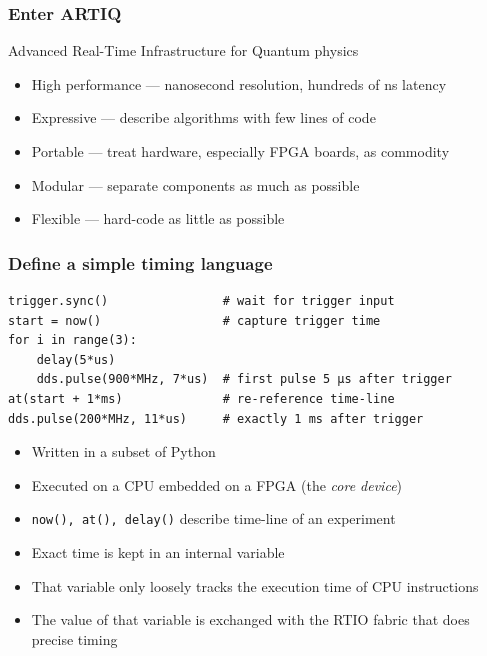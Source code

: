 \documentclass[final,presentation,compress]{beamer}
\begin{document}
\begin{frame}
  \frametitle{Enter ARTIQ}
  \alert{A}dvanced \alert{R}eal-\alert{T}ime \alert{I}nfrastructure for \alert{Q}uantum physics

  \footnotesize
  \begin{itemize}
    \item High performance --- nanosecond resolution, hundreds of ns latency
    \item Expressive --- describe algorithms with few lines of code
    \item Portable --- treat hardware, especially FPGA boards, as commodity
    \item Modular --- separate components as much as possible
    \item Flexible --- hard-code as little as possible
  \end{itemize}
\end{frame}

\begin{frame}[fragile]
  \frametitle{Define a simple timing language}
  \footnotesize

  \begin{verbatim}
trigger.sync()                # wait for trigger input
start = now()                 # capture trigger time
for i in range(3):
    delay(5*us)
    dds.pulse(900*MHz, 7*us)  # first pulse 5 µs after trigger
at(start + 1*ms)              # re-reference time-line
dds.pulse(200*MHz, 11*us)     # exactly 1 ms after trigger
  \end{verbatim}

  \begin{itemize}
    \item Written in a subset of Python
    \item Executed on a CPU embedded on a FPGA (the \emph{core device})
    \item \verb!now(), at(), delay()! describe time-line of an experiment
    \item Exact time is kept in an internal variable
    \item That variable only loosely tracks the execution time of CPU instructions
    \item The value of that variable is exchanged with the RTIO fabric that
      does precise timing
  \end{itemize}
\end{frame}
\end{document}
